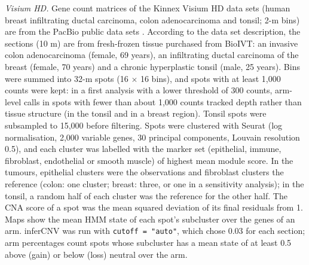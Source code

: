 \emph{Visium HD.} Gene count matrices of the Kinnex Visium HD data sets (human breast infiltrating ductal carcinoma, colon adenocarcinoma and tonsil; 2-\textmu m bins) are from the PacBio public data sets \citep{pacbio2026visiumhd}. According to the data set description, the sections (10 \textmu m) are from fresh-frozen tissue purchased from BioIVT: an invasive colon adenocarcinoma (female, 69 years), an infiltrating ductal carcinoma of the breast (female, 70 years) and a chronic hyperplastic tonsil (male, 25 years). Bins were summed into 32-\textmu m spots (16 $\times$ 16 bins), and spots with at least 1,000 counts were kept: in a first analysis with a lower threshold of 300 counts, arm-level calls in spots with fewer than about 1,000 counts tracked depth rather than tissue structure (in the tonsil and in a breast region). Tonsil spots were subsampled to 15,000 before filtering. Spots were clustered with Seurat (log normalisation, 2,000 variable genes, 30 principal components, Louvain resolution 0.5), and each cluster was labelled with the marker set (epithelial, immune, fibroblast, endothelial or smooth muscle) of highest mean module score. In the tumours, epithelial clusters were the observations and fibroblast clusters the reference (colon: one cluster; breast: three, or one in a sensitivity analysis); in the tonsil, a random half of each cluster was the reference for the other half. The CNA score of a spot was the mean squared deviation of its final residuals from 1. Maps show the mean HMM state of each spot's subcluster over the genes of an arm. inferCNV was run with \texttt{cutoff\ =\ "auto"}, which chose 0.03 for each section; arm percentages count spots whose subcluster has a mean state of at least 0.5 above (gain) or below (loss) neutral over the arm.

